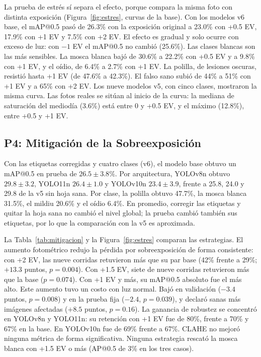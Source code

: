 \documentclass[sensors,article,submit,pdftex,moreauthors]{Definitions/mdpi}
\begin{document}
La prueba de estrés sí separa el efecto, porque compara la misma foto con distinta exposición (Figura~\ref{fig:estres}, curvas de la base). Con los modelos v6 base, el mAP@0.5 pasó de 26.3\% con la exposición original a 23.0\% con +0.5 EV, 17.9\% con +1 EV y 7.5\% con +2 EV. El efecto es gradual y solo ocurre con exceso de luz: con $-1$ EV el mAP@0.5 no cambió (25.6\%). Las clases blancas son las más sensibles. La mosca blanca bajó de 30.6\% a 22.2\% con +0.5 EV y a 9.8\% con +1 EV, y el oídio, de 6.4\% a 2.7\% con +1 EV. La polilla, de lesiones oscuras, resistió hasta +1 EV (de 47.6\% a 42.3\%). El falso sano subió de 44\% a 51\% con +1 EV y a 65\% con +2 EV. Los nueve modelos v5, con cinco clases, mostraron la misma curva. Las fotos reales se sitúan al inicio de la curva: la mediana de saturación del mediodía (3.6\%) está entre 0 y +0.5 EV, y el máximo (12.8\%), entre +0.5 y +1 EV.

\subsection{P4: Mitigación de la Sobreexposición}

Con las etiquetas corregidas y cuatro clases (v6), el modelo base obtuvo un mAP@0.5 en prueba de $26.5 \pm 3.8\%$. Por arquitectura, YOLOv8n obtuvo $29.8 \pm 3.2$, YOLO11n $26.4 \pm 1.0$ y YOLOv10n $23.4 \pm 3.9$, frente a 25.8, 24.0 y 29.8 de la v5 sin hoja sana. Por clase, la polilla obtuvo 47.7\%, la mosca blanca 31.5\%, el mildiu 20.6\% y el oídio 6.4\%. En promedio, corregir las etiquetas y quitar la hoja sana no cambió el nivel global; la prueba cambió también sus etiquetas, por lo que la comparación con la v5 es aproximada.

La Tabla~\ref{tab:mitigacion} y la Figura~\ref{fig:estres} comparan las estrategias. El aumento fotométrico redujo la pérdida por sobreexposición de forma consistente: con +2 EV, las nueve corridas retuvieron más que su par base (42\% frente a 29\%; $+13.3$ puntos, $p = 0.004$). Con +1.5 EV, siete de nueve corridas retuvieron más que la base ($p = 0.074$). Con +1 EV y más, su mAP@0.5 absoluto fue el más alto. Este aumento tuvo un costo con luz normal. Bajó en validación ($-3.4$ puntos, $p = 0.008$) y en la prueba fija ($-2.4$, $p = 0.039$), y declaró sanas más imágenes afectadas ($+8.5$ puntos, $p = 0.16$). La ganancia de robustez se concentró en YOLOv8n y YOLO11n: su retención con +1 EV fue de 80\%, frente a 70\% y 67\% en la base. En YOLOv10n fue de 69\% frente a 67\%. CLAHE no mejoró ninguna métrica de forma significativa. Ninguna estrategia rescató la mosca blanca con +1.5 EV o más (AP@0.5 de 3\% en los tres casos).
\end{document}
